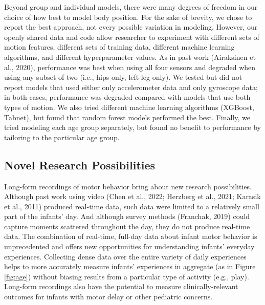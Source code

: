 \documentclass[
  man]{apa6}
\begin{document}
Beyond group and individual models, there were many degrees of freedom in our choice of how best to model body position. For the sake of brevity, we chose to report the best approach, not every possible variation in modeling. However, our openly shared data and code allow researcher to experiment with different sets of motion features, different sets of training data, different machine learning algorithms, and different hyperparameter values. As in past work (Airaksinen et al., 2020), performance was best when using all four sensors and degraded when using any subset of two (i.e., hips only, left leg only). We tested but did not report models that used either only accelerometer data and only gyroscope data; in both cases, performance was degraded compared with models that use both types of motion. We also tried different machine learning algorithms (XGBoost, Tabnet), but found that random forest models performed the best. Finally, we tried modeling each age group separately, but found no benefit to performance by tailoring to the particular age group.

\hypertarget{novel-research-possibilities}{%
\subsection{Novel Research Possibilities}\label{novel-research-possibilities}}

Long-form recordings of motor behavior bring about new research possibilities. Although past work using video (Chen et al., 2022; Herzberg et al., 2021; Karasik et al., 2011) produced real-time data, such data were limited to a relatively small part of the infants' day. And although survey methods (Franchak, 2019) could capture moments scattered throughout the day, they do not produce real-time data. The combination of real-time, full-day data about infant motor behavior is unprecedented and offers new opportunities for understanding infants' everyday experiences. Collecting dense data over the entire variety of daily experiences helps to more accurately measure infants' experiences in aggregate (as in Figure \ref{fig:age}) without biasing results from a particular type of activity (e.g., play). Long-form recordings also have the potential to measure clinically-relevant outcomes for infants with motor delay or other pediatric concerns.
\end{document}
